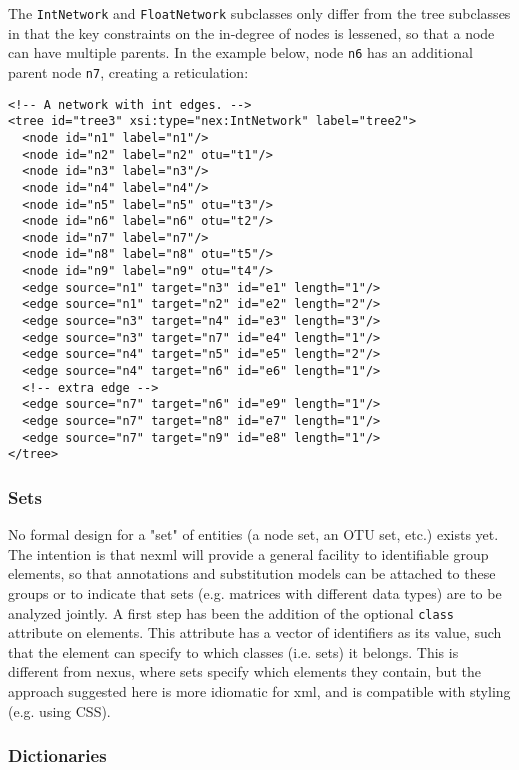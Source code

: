 \documentclass{article}
\newcommand{\code}{\texttt}
\begin{document}
The \code{IntNetwork} and \code{FloatNetwork} subclasses only differ from the tree subclasses in that the key constraints on the in-degree of nodes is lessened, so that a node can have multiple parents. In the example below, node \code{n6} has an additional parent node \code{n7}, creating a reticulation:
\begin{verbatim}
<!-- A network with int edges. -->
<tree id="tree3" xsi:type="nex:IntNetwork" label="tree2">
  <node id="n1" label="n1"/>
  <node id="n2" label="n2" otu="t1"/>
  <node id="n3" label="n3"/>
  <node id="n4" label="n4"/>
  <node id="n5" label="n5" otu="t3"/>
  <node id="n6" label="n6" otu="t2"/>
  <node id="n7" label="n7"/>
  <node id="n8" label="n8" otu="t5"/>
  <node id="n9" label="n9" otu="t4"/>
  <edge source="n1" target="n3" id="e1" length="1"/>			
  <edge source="n1" target="n2" id="e2" length="2"/>
  <edge source="n3" target="n4" id="e3" length="3"/>
  <edge source="n3" target="n7" id="e4" length="1"/>
  <edge source="n4" target="n5" id="e5" length="2"/>
  <edge source="n4" target="n6" id="e6" length="1"/>
  <!-- extra edge -->
  <edge source="n7" target="n6" id="e9" length="1"/> 
  <edge source="n7" target="n8" id="e7" length="1"/>
  <edge source="n7" target="n9" id="e8" length="1"/>
</tree>
\end{verbatim}

\subsubsection{Sets}

No formal design for a "set" of entities (a node set, an OTU set, etc.) exists yet. The intention is that nexml will provide a 
general facility to identifiable group elements, so that annotations and substitution models can be attached to these groups or 
to indicate that sets (e.g. matrices with different data types) are to be analyzed jointly. A first step has been the addition of 
the optional \code{class} attribute on elements. This attribute has a vector of identifiers as its value, such that the element 
can specify to which classes (i.e. sets) it belongs. This is different from nexus, where sets specify which elements they contain, 
but the approach suggested here is more idiomatic for xml, and is compatible with styling (e.g. using CSS).

\subsubsection{Dictionaries}
\end{document}
